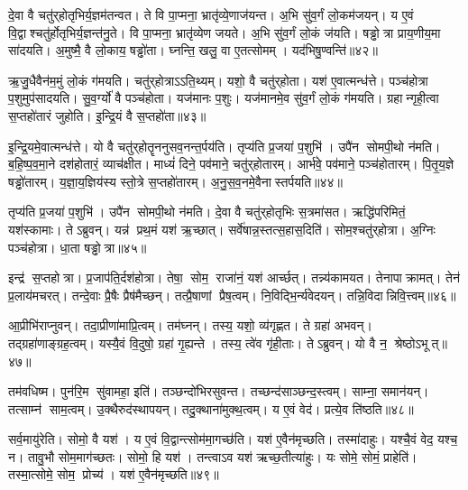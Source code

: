दे॒वा वै चतु॑र्‌होतृभिर्य॒ज्ञम॑तन्वत।
ते वि पा॒प्मना॒ भ्रातृ॑व्ये॒णाज॑यन्त।
अ॒भि सु॑व॒र्गं लो॒कम॑जयन्।
य ए॒वं वि॒द्वाश्चतु॑र्होतृभिर्य॒ज्ञन्त॑नु॒ते।
वि पा॒प्मना॒ भ्रातृ॑व्येण जयते।
अ॒भि सु॑व॒र्गं लो॒कं ज॑यति।
षड्ढोत्रा प्राय॒णीय॒मा सा॑दयति।
अ॒मुष्मै॒ वै लो॒काय॒ षड्ढो॑ता।
घ्नन्ति॒ खलु॒ वा ए॒तत्सोमम्।
यद॑भिषु॒ण्वन्ति॑॥४२॥

ऋ॒जु॒धैवैन॑म॒मुं लो॒कं ग॑मयति।
चतु॑र्‌होत्राऽऽति॒थ्यम्।
यशो॒ वै चतु॑र्‌होता।
यश॑ ए॒वात्मन्ध॑त्ते।
पञ्च॑होत्रा प॒शुमुप॑सादयति।
सु॒व॒र्ग्यो॑ वै पञ्च॑होता।
यज॑मानः प॒शुः।
यज॑मानमे॒व सु॑व॒र्गं लो॒कं ग॑मयति।
ग्रहान्गृही॒त्वा स॒प्तहो॑तारं जुहोति।
इ॒न्द्रि॒यं वै स॒प्तहो॑ता॥४३॥

इ॒न्द्रि॒यमे॒वात्मन्ध॑त्ते।
यो वै चतु॑र्‌होतॄननुसव॒नन्त॒र्पय॑ति।
तृप्य॑ति प्र॒जया॑ प॒शुभि॑।
उपै॑न सोमपी॒थो न॑मति।
ब॒हि॒ष्प॒व॒मा॒ने दश॑होतारं॒ व्याच॑क्षीत।
माध्यं॑ दिने॒ पव॑माने॒ चतु॑र्‌होतारम्।
आर्भ॑वे॒ पव॑माने॒ पञ्च॑होतारम्।
पि॒तृ॒य॒ज्ञे षड्ढो॑तारम्।
य॒ज्ञा॒य॒ज्ञिय॑स्य स्तो॒त्रे स॒प्तहो॑तारम्।
अ॒नु॒स॒व॒नमे॒वैनास्तर्पयति॥४४॥

तृप्य॑ति प्र॒जया॑ प॒शुभि॑।
उपै॑न सोमपी॒थो न॑मति।
दे॒वा वै चतु॑र्‌होतृभिः स॒त्रमा॑सत।
ऋद्धि॑परिमितं॒ यश॑स्कामाः।
तेऽब्रुवन्।
यन्न॑ प्रथ॒मं यश॑ ऋ॒च्छात्।
सर्वे॑षान्न॒स्तत्स॒हास॒दिति॑।
सोम॒श्चतु॑र्‌होत्रा।
अ॒ग्निः पञ्च॑होत्रा।
धा॒ता षड्ढोत्रा॥४५॥

इन्द्र॑ स॒प्तहोत्रा।
प्र॒जाप॑ति॒र्दश॑होत्रा।
तेषा॒ सोम॒ राजा॑नं॒ यश॑ आर्च्छत्।
तन्न्य॑कामयत।
तेनापाक्रामत्।
तेन॑ प्र॒लाय॑मचरत्।
तन्दे॒वाः प्रै॒षैः प्रैष॑मैच्छन्।
तत्प्रै॒षाणां प्रैष॒त्वम्।
नि॒विद्भि॒र्न्य॑वेदयन्।
तन्नि॒विदान्निवि॒त्त्वम्॥४६॥

आ॒प्रीभि॑राप्नुवन्।
तदा॒प्रीणा॑माप्रि॒त्वम्।
तम॑घ्नन्।
तस्य॒ यशो॒ व्य॑गृह्णत।
ते ग्रहा॑ अभवन्।
तद्ग्रहा॑णाङ्ग्रह॒त्वम्।
यस्यै॒वं वि॒दुषो॒ ग्रहा॑ गृ॒ह्यन्ते।
तस्य॒ त्वे॑व गृ॑ही॒ताः।
तेऽब्रुवन्।
यो वै न॒ श्रेष्ठोऽभूत्॥४७॥

तम॑वधिष्म।
पुन॑रि॒म सु॑वामहा॒ इति॑।
तञ्छन्दो॑भिरसुवन्त।
तच्छन्द॑साञ्छन्द॒स्त्वम्।
साम्ना॒ समान॑यन्।
तत्साम्न॑ साम॒त्वम्।
उ॒क्थैरुद॑स्थापयन्।
तदु॒क्थाना॑मुक्थ॒त्वम्।
य ए॒वं वेद॑।
प्रत्ये॒व ति॑ष्ठति॥४८॥

सर्व॒मायु॑रेति।
सोमो॒ वै यश॑।
य ए॒वं वि॒द्वान्त्सोम॑मा॒गच्छ॑ति।
यश॑ ए॒वैन॑मृच्छति।
तस्मा॑दाहुः।
यश्चै॒वं वेद॒ यश्च॒ न।
तावु॒भौ सोम॒माग॑च्छतः।
सोमो॒ हि यश॑।
तन्त्वाऽव यश॑ ऋच्छ॒तीत्या॑हुः।
यः सोमे॒ सोमं॒ प्राहेति॑।
तस्मा॒त्सोमे॒ सोम॒ प्रोच्य॑।
यश॑ ए॒वैन॑मृच्छति॥४९॥

